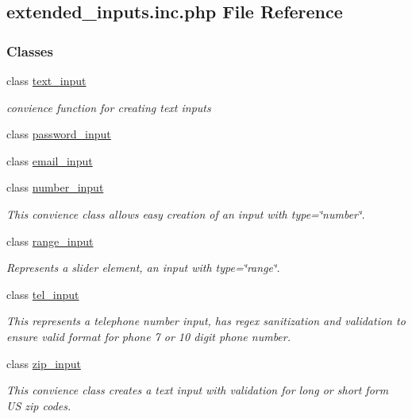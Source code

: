 \hypertarget{extended__inputs_8inc_8php}{\subsection{extended\-\_\-inputs.\-inc.\-php File Reference}
\label{extended__inputs_8inc_8php}
}
\subsubsection*{Classes}
\begin{DoxyCompactItemize}
\item 
class \hyperlink{classtext__input}{text\-\_\-input}
\begin{DoxyCompactList}\small\item\em convience function for creating text inputs \end{DoxyCompactList}\item 
class \hyperlink{classpassword__input}{password\-\_\-input}
\item 
class \hyperlink{classemail__input}{email\-\_\-input}
\item 
class \hyperlink{classnumber__input}{number\-\_\-input}
\begin{DoxyCompactList}\small\item\em This convience class allows easy creation of an input with type=\char`\"{}number\char`\"{}. \end{DoxyCompactList}\item 
class \hyperlink{classrange__input}{range\-\_\-input}
\begin{DoxyCompactList}\small\item\em Represents a slider element, an input with type=\char`\"{}range\char`\"{}. \end{DoxyCompactList}\item 
class \hyperlink{classtel__input}{tel\-\_\-input}
\begin{DoxyCompactList}\small\item\em This represents a telephone number input, has regex sanitization and validation to ensure valid format for phone 7 or 10 digit phone number. \end{DoxyCompactList}\item 
class \hyperlink{classzip__input}{zip\-\_\-input}
\begin{DoxyCompactList}\small\item\em This convience class creates a text input with validation for long or short form U\-S zip codes. \end{DoxyCompactList}\item 

\end{DoxyCompactItemize}
